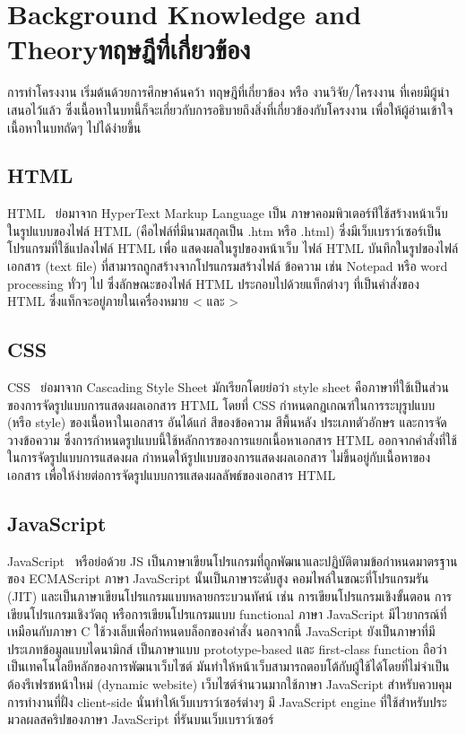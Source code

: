 \chapter{\ifenglish Background Knowledge and Theory\else ทฤษฎีที่เกี่ยวข้อง\fi}

การทำโครงงาน เริ่มต้นด้วยการศึกษาค้นคว้า ทฤษฎีที่เกี่ยวข้อง หรือ งานวิจัย/โครงงาน ที่เคยมีผู้นำเสนอไว้แล้ว ซึ่งเนื้อหาในบทนี้ก็จะเกี่ยวกับการอธิบายถึงสิ่งที่เกี่ยวข้องกับโครงงาน เพื่อให้ผู้อ่านเข้าใจเนื้อหาในบทถัดๆ ไปได้ง่ายขึ้น

\section{HTML}
HTML~\cite{HTML} ย่อมาจาก HyperText Markup Language เป็น ภาษาคอมพิวเตอร์ท่ีใช้สร้างหน้าเว็บในรูปแบบของไฟล์ HTML (คือไฟล์ที่มีนามสกุลเป็น .htm หรือ .html) ซึ่งมีเว็บเบราว์เซอร์เป็นโปรแกรมที่ใช้แปลงไฟล์ HTML เพื่อ แสดงผลในรูปของหน้าเว็บ
ไฟล์ HTML บันทึกในรูปของไฟล์เอกสาร (text file) ที่สามารถถูกสร้างจากโปรแกรมสร้างไฟล์ ข้อความ เช่น Notepad หรือ word processing ทั่วๆ ไป ซึ่งลักษณะของไฟล์ HTML ประกอบไปด้วยแท็กต่างๆ ที่เป็นคำสั่งของ HTML ซึ่งแท็กจะอยู่ภายในเครื่องหมาย < และ >

\section{CSS}
CSS~\cite{CSS} ย่อมาจาก Cascading Style Sheet  มักเรียกโดยย่อว่า style sheet คือภาษาที่ใช้เป็นส่วนของการจัดรูปแบบการแสดงผลเอกสาร  HTML โดยที่ CSS กำหนดกฏเกณฑ์ในการระบุรูปแบบ (หรือ style) ของเนื้อหาในเอกสาร 
อันได้แก่ สีของข้อความ สีพื้นหลัง ประเภทตัวอักษร และการจัดวางข้อความ ซึ่งการกำหนดรูปแบบนี้ใช้หลักการของการแยกเนื้อหาเอกสาร HTML ออกจากคำสั่งที่ใช้ในการจัดรูปแบบการแสดงผล กำหนดให้รูปแบบของการแสดงผลเอกสาร 
ไม่ขึ้นอยู่กับเนื้อหาของเอกสาร เพื่อให้ง่ายต่อการจัดรูปแบบการแสดงผลลัพธ์ของเอกสาร HTML

\section{JavaScript}
JavaScript~\cite{JavaScript} หรือย่อด้วย JS เป็นภาษาเขียนโปรแกรมที่ถูกพัฒนาและปฏิบัติตามข้อกำหนดมาตรฐานของ ECMAScript
ภาษา JavaScript นั้นเป็นภาษาระดับสูง คอมไพล์ในขณะที่โปรแกรมรัน (JIT) และเป็นภาษาเขียนโปรแกรมแบบหลายกระบวนทัศน์ เช่น การเขียนโปรแกรมเชิงขั้นตอน การเขียนโปรแกรมเชิงวัตถุ หรือการเขียนโปรแกรมแบบ functional 
ภาษา JavaScript มีไวยากรณ์ที่เหมือนกับภาษา C ใช้วงเล็บเพื่อกำหนดบล็อกของคำสั่ง นอกจากนี้ JavaScript ยังเป็นภาษาที่มีประเภทข้อมูลแบบไดนามิกส์ เป็นภาษาแบบ prototype-based และ first-class function
%
ถือว่าเป็นเทคโนโลยีหลักของการพัฒนาเว็บไซต์ มันทำให้หน้าเว็บสามารถตอบโต้กับผู้ใช้ได้โดยที่ไม่จำเป็นต้องรีเฟรชหน้าใหม่ (dynamic website) เว็บไซต์จำนวนมากใช้ภาษา JavaScript 
สำหรับควบคุมการทำงานที่ฝั่ง client-side นั่นทำให้เว็บเบราว์เซอร์ต่างๆ มี JavaScript engine ที่ใช้สำหรับประมวลผลสคริปของภาษา JavaScript ที่รันบนเว็บเบราว์เซอร์

